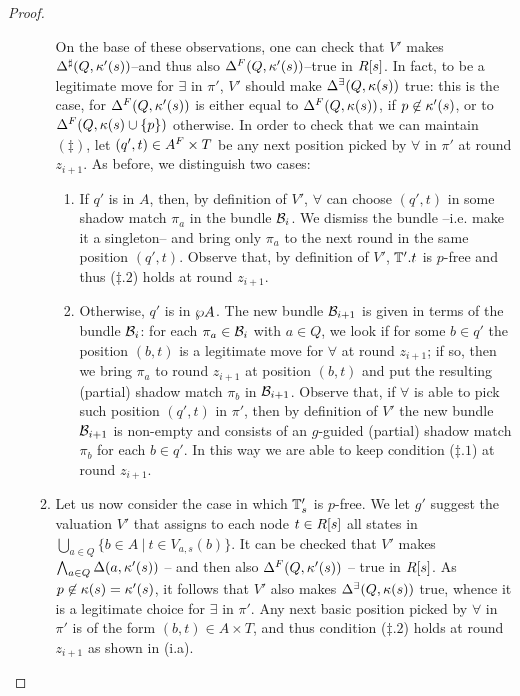\begin{proof}
\begin{enumerate}[label = (\Alph*), ref = \Alph*]
\begin{enumerate}[label = (\roman*), ref = \roman*]
       On the base of these observations, one can check that $V'$ makes $\Delta^{\sharp}(Q,\kappa'(s))$--and thus also $\Delta^{F}(Q,\kappa'(s))$--true in $R[s]$. In fact, to be a legitimate move for $\exists$ in $\pi'$, $V'$ should make $\Delta^\exists(Q,\kappa(s))$ true: this is the case, for $\Delta^{F}(Q,\kappa'(s))$ is either equal to $\Delta^{F}(Q,\kappa(s))$, if $p \not\in \kappa'(s)$, or to $\Delta^{F}(Q,\kappa(s)\cup\{p\})$ otherwise. In order to check that we can maintain $(\ddag)$, let $(q',t) \in A^{F} \times T$ be any next position picked by $\forall$ in $\pi'$ at round $z_{i+1}$. As before, we distinguish two cases:
       \begin{enumerate}[label = (\alph*), ref = \alph*]
         \item If $q'$ is in $A$, then, by definition of $V'$, $\forall$ can choose $(q',t)$ in some shadow match $\pi_a$ in the bundle $\mathcal{B}_i$. We dismiss the bundle --i.e. make it a singleton-- and bring only $\pi_a$ to the next round in the same position $(q',t)$. Observe that, by definition of $V'$, $\mathbb{T}'.t$ is $p$-free and thus ($\ddag.2$) holds at round $z_{i+1}$. \label{point:ddag2CardfromMacro}
         \item Otherwise, $q'$ is in $\wp A$. The new bundle $\mathcal{B}_{i+1}$ is given in terms of the bundle $\mathcal{B}_i$: for each $\pi_a \in \mathcal{B}_i$ with $a\in Q$, we look if for some $b \in q'$ the position $(b,t)$ is a legitimate move for $\forall$ at round $z_{i+1}$; if so, then we bring $\pi_a$ to round $z_{i+1}$ at position $(b,t)$ and put the resulting (partial) shadow match $\pi_b$ in $\mathcal{B}_{i+1}$. Observe that, if $\forall$ is able to pick such position $(q',t)$ in $\pi'$, then by definition of $V'$ the new bundle $\mathcal{B}_{i+1}$ is non-empty and consists of an $g$-guided (partial) shadow match $\pi_b$ for each $b \in q'$. In this way we are able to keep condition ($\ddag.1$) at round $z_{i+1}$.
       \end{enumerate}
    \item Let us now consider the case in which $\mathbb{T}'_s$ is $p$-free. We let $g'$ suggest the valuation $V'$ that assigns to each node $t \in R[s]$ all states in $\bigcup_{a \in Q}\{b \in A\ |\ t \in V_{a,s}(b)\}$. It can be checked that $V'$ makes $\bigwedge_{a \in Q} \Delta(a,\kappa'(s))$ -- and then also $\Delta^{F}(Q,\kappa'(s))$ -- true in $R[s]$. As $p \not\in \kappa(s)=\kappa'(s)$, it follows that $V'$ also makes $\Delta^\exists(Q,\kappa(s))$ true, whence it is a legitimate choice for $\exists$ in $\pi'$. Any next basic position picked by $\forall$ in $\pi'$ is of the form $(b,t) \in A \times T$, and thus condition ($\ddag.2$) holds at round $z_{i+1}$ as shown in (i.a). %

\end{enumerate}
\end{enumerate}
\end{proof}
